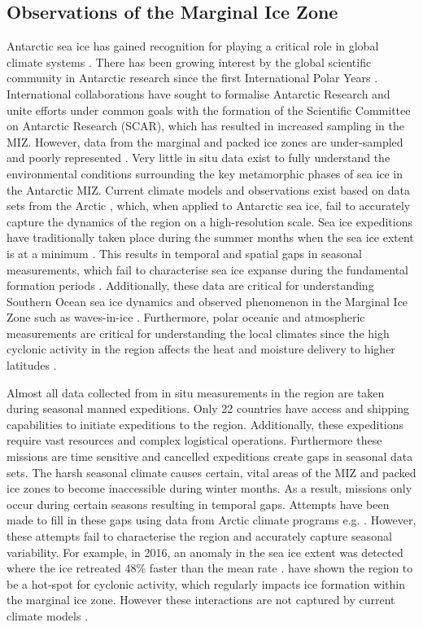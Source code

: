 \subsection{Observations of the Marginal Ice Zone}
Antarctic sea ice has gained recognition for playing a critical role in global climate systems \cite{kennicutt2016delivering}. There has been growing interest by the global scientific community in Antarctic research since the first International Polar Years \cite{kennicutt2016delivering}. International collaborations have sought to formalise Antarctic Research and unite efforts under common goals \cite{kennicutt2016delivering} with the formation of the Scientific Committee on Antarctic Research (SCAR), which has resulted in increased sampling in the MIZ. However, data from the marginal and packed ice zones are under-sampled and poorly represented \cite{vichi2019effects}. Very little in situ data exist to fully understand the environmental conditions surrounding the key metamorphic phases of sea ice in the Antarctic MIZ. Current climate models and observations exist based on data sets from the Arctic \cite{vichi2019effects}, which, when applied to Antarctic sea ice, fail to accurately capture the dynamics of the region on a high-resolution scale. Sea ice expeditions have traditionally taken place during the summer months when the sea ice extent is at a minimum \cite{kennicutt2016delivering}. This results in temporal and spatial gaps in seasonal measurements, which fail to characterise sea ice expanse during the fundamental formation periods \cite{MAKSYM2012seaiceextent}. Additionally, these data are critical for understanding Southern Ocean sea ice dynamics and observed phenomenon in the Marginal Ice Zone such as waves-in-ice \cite{kohout2014storm}. Furthermore, polar oceanic and atmospheric measurements are critical for understanding the local climates since the high cyclonic activity in the region affects the heat and moisture delivery to higher latitudes \cite{vichi2019effects}.

Almost all data collected from in situ measurements in the region are taken during seasonal manned expeditions. Only 22 countries have access and shipping capabilities to initiate expeditions to the region. Additionally, these expeditions require vast resources and complex logistical operations. Furthermore these missions are time sensitive and cancelled expeditions create gaps in seasonal data sets. The harsh seasonal climate causes certain, vital areas of the MIZ and packed ice zones to become inaccessible during winter months. As a result, missions only occur during certain seasons resulting in temporal gaps. Attempts have been made to fill in these gaps using data from Arctic climate programs e.g. \textcite{lee2012program}. However, these attempts fail to characterise the region and accurately capture seasonal variability. For example, in 2016, an anomaly in the sea ice extent was detected where the ice retreated 48\% faster than the mean rate \cite{turner2017unprecedented}. \textcite{vichi2019effects} have shown the region to be a hot-spot for cyclonic activity, which regularly impacts ice formation within the marginal ice zone. However these interactions are not captured by current climate models \cite{vichi2019effects}.\par

